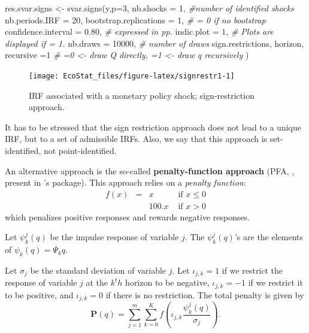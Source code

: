 \documentclass[
  12pt,
]{book}
\newenvironment{Shaded}{\begin{snugshade}}{\end{snugshade}}
\newcommand{\AttributeTok}[1]{\textcolor[rgb]{0.77,0.63,0.00}{#1}}
\newcommand{\CommentTok}[1]{\textcolor[rgb]{0.56,0.35,0.01}{\textit{#1}}}
\newcommand{\DecValTok}[1]{\textcolor[rgb]{0.00,0.00,0.81}{#1}}
\newcommand{\FloatTok}[1]{\textcolor[rgb]{0.00,0.00,0.81}{#1}}
\newcommand{\FunctionTok}[1]{\textcolor[rgb]{0.00,0.00,0.00}{#1}}
\newcommand{\NormalTok}[1]{#1}
\newcommand{\OtherTok}[1]{\textcolor[rgb]{0.56,0.35,0.01}{#1}}
\theoremstyle{definition}
\theoremstyle{definition}
\theoremstyle{definition}
\theoremstyle{definition}
\theoremstyle{remark}
\begin{document}
\begin{Shaded}
\begin{Highlighting}[]
\NormalTok{res.svar.signs }\OtherTok{\textless{}{-}} 
  \FunctionTok{svar.signs}\NormalTok{(y,}\AttributeTok{p=}\DecValTok{3}\NormalTok{,}
             \AttributeTok{nb.shocks =} \DecValTok{1}\NormalTok{, }\CommentTok{\#number of identified shocks}
             \AttributeTok{nb.periods.IRF =} \DecValTok{20}\NormalTok{,}
             \AttributeTok{bootstrap.replications =} \DecValTok{1}\NormalTok{, }\CommentTok{\# = 0 if no bootstrap}
             \AttributeTok{confidence.interval =} \FloatTok{0.80}\NormalTok{, }\CommentTok{\# expressed in pp.}
             \AttributeTok{indic.plot =} \DecValTok{1}\NormalTok{, }\CommentTok{\# Plots are displayed if = 1.}
             \AttributeTok{nb.draws =} \DecValTok{10000}\NormalTok{, }\CommentTok{\# number of draws}
\NormalTok{             sign.restrictions,}
\NormalTok{             horizon,}
             \AttributeTok{recursive =}\DecValTok{1} \CommentTok{\#  =0 \textless{}{-} draw Q directly, =1 \textless{}{-} draw q recursively}
\NormalTok{  )}
\end{Highlighting}
\end{Shaded}

\begin{figure}
\texttt{[image: EcoStat\_files/figure-latex/signrestr1-1]} \caption{IRF associated with a monetary policy shock; sign-restriction approach.}\label{fig:signrestr1}
\end{figure}

It has to be stressed that the sign restriction approach does not lead to a unique IRF, but to a set of admissible IRFs. Also, we say that this approach is set-identified, not point-identified.

An alternative approach is the so-called \textbf{penalty-function approach} (PFA, \citet{Uhlig_2005}, present in \citet{Danne_2015}'s package). This approach relies on a \emph{penalty function}:
\[
\begin{array}{llll}f(x)&=&x&\text{ if }x\le0\\
&&100.x&\text{ if }x>0\end{array}
\]
which penalizes positive responses and rewards negative responses.

Let \(\psi_k^j(q)\) be the impulse response of variable \(j\). The \(\psi_k^j(q)\)'s are the elements of \(\psi_k(q)=\Psi_kq\).

Let \(\sigma_j\) be the standard deviation of variable \(j\). Let \(\iota_{j,k}=1\) if we restrict the response of variable \(j\) at the \(k^th\) horizon to be negative, \(\iota_{j,k}=-1\) if we restrict it to be positive, and \(\iota_{j,k}=0\) if there is no restriction. The total penalty is given by \[
\mathbf{P}(q)=\sum_{j=1}^m\sum_{k=0}^Kf\left(\iota_{j,k}\frac{\psi_k^j(q)}{\sigma_j}\right).
\]
\end{document}
